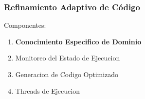 \documentclass{beamer}\usetheme{Madrid} %
\begin{document}
\begin{frame}
\frametitle{Refinamiento Adaptivo de Código}
Componentes:
\begin{enumerate}
\item \textbf{Conocimiento Especifico de Dominio}
\item Monitoreo del Estado de Ejecucion
\item Generacion de Codigo Optimizado
\item Threads de Ejecucion
\end{enumerate}
\end{frame}
\end{document}

